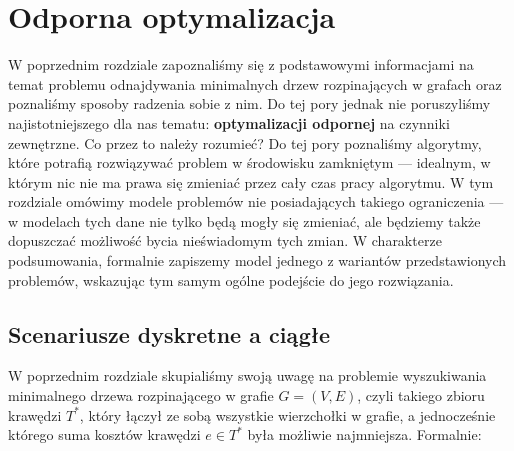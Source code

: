 \chapter{Odporna optymalizacja}
\thispagestyle{chapterBeginStyle}

W poprzednim rozdziale zapoznaliśmy się z podstawowymi informacjami na temat problemu odnajdywania minimalnych drzew rozpinających w grafach oraz poznaliśmy sposoby radzenia sobie z nim. Do tej pory jednak nie poruszyliśmy najistotniejszego dla nas tematu: \textbf{optymalizacji odpornej} na czynniki zewnętrzne. Co przez to należy rozumieć? Do tej pory poznaliśmy algorytmy, które potrafią rozwiązywać problem w środowisku zamkniętym --- idealnym, w którym nic nie ma prawa się zmieniać przez cały czas pracy algorytmu. W tym rozdziale omówimy modele problemów nie posiadających takiego ograniczenia --- w modelach tych dane nie tylko będą mogły się zmieniać, ale będziemy także dopuszczać możliwość bycia nieświadomym tych zmian. W charakterze podsumowania, formalnie zapiszemy model jednego z wariantów przedstawionych problemów, wskazując tym samym ogólne podejście do jego rozwiązania.

\section{Scenariusze dyskretne a ciągłe}

W poprzednim rozdziale skupialiśmy swoją uwagę na problemie wyszukiwania minimalnego drzewa rozpinającego w grafie $G = \left( V, E \right)$, czyli takiego zbioru krawędzi $T^{\ast}$, który łączył ze sobą wszystkie wierzchołki w grafie, a jednocześnie którego suma kosztów krawędzi $e \in T^{\ast}$ była możliwie najmniejsza. Formalnie:

